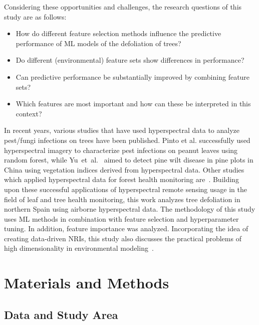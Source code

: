 \documentclass[remotesensing,article,accept,moreauthors,pdftex]{Definitions/mdpi}
\begin{document}
Considering these opportunities and challenges, the research questions of this study are as follows:

\begin{itemize}

	\item How do different feature selection methods influence the predictive performance of ML models of the defoliation of trees?

	\item Do different (environmental) feature sets show differences in performance?

	\item Can predictive performance be substantially improved by combining feature sets?

	\item Which features are most important and how can these be interpreted in this context?

\end{itemize}

In recent years, various studies that have used hyperspectral data to analyze pest/fungi infections on trees have been published.
Pinto et al. \citep{pinto2020} successfully used hyperspectral imagery to characterize pest infections on peanut leaves using random forest, while Yu~et~al.~\cite{yu2021} aimed to detect pine wilt disease in pine plots in China using vegetation indices derived from hyperspectral data.
Other studies which applied hyperspectral data for forest health monitoring are~\cite{lin2014,kayet2019,dash2017}.
Building upon these successful applications of hyperspectral remote sensing usage in the field of leaf and tree health monitoring, this work analyzes tree defoliation in northern Spain using airborne hyperspectral data.
The methodology of this study uses ML methods in combination with feature selection and hyperparameter tuning.
In addition, feature importance was analyzed.
Incorporating the idea of creating data-driven \ac{NRI}s, this study also discusses the practical problems of high dimensionality in environmental modeling~\cite{trunk1979, xu2016}.

\section{Materials and Methods}

\subsection{Data and Study Area}
\end{document}
